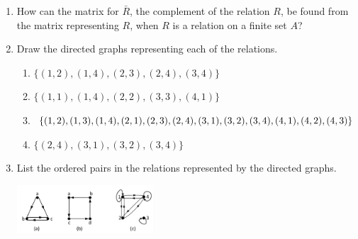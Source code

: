 \documentclass{sig-alternate-05-2015}
\begin{document}
\begin{enumerate}
\item How can the matrix for $\bar{R}$, the complement of the
relation $R$, be found from the matrix representing $R$,
when $R$ is a relation on a finite set $A$?

\item Draw the directed graphs representing each of the relations.
\begin{enumerate}
	\item $\{(1, 2), (1, 4), (2, 3), (2, 4), (3, 4)\}$
	\item $\{(1, 1), (1, 4), (2, 2), (3, 3), (4, 1)\}$
	\item $\{(1, 2), (1, 3), (1, 4), (2, 1), (2, 3), (2, 4),\\ (3, 1), (3, 2),
		(3, 4), (4, 1), (4, 2), (4, 3)\}$
	\item $\{(2, 4), (3, 1), (3, 2), (3, 4)\}$
\end{enumerate}

\item List the ordered pairs in the relations represented by the directed graphs.

	\includegraphics[width=0.4\textwidth]{figs/123.pdf}
\end{enumerate}
\end{document}
